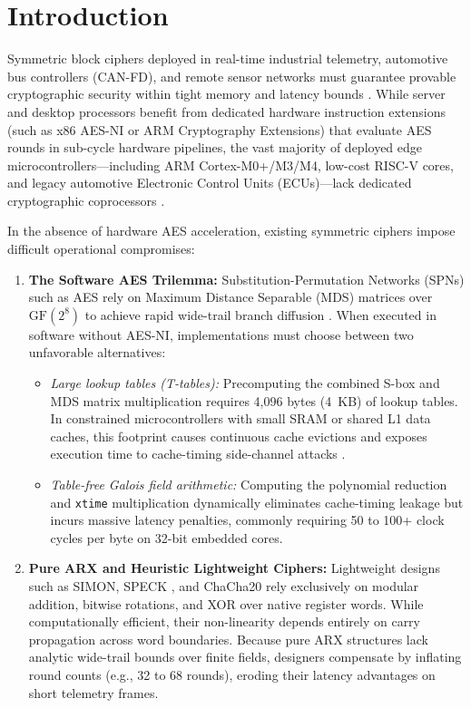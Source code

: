 \documentclass[review,12pt]{elsarticle}
\begin{document}
\section{Introduction}
\label{sec:intro}
Symmetric block ciphers deployed in real-time industrial telemetry, automotive bus controllers (CAN-FD), and remote sensor networks must guarantee provable cryptographic security within tight memory and latency bounds \cite{shannon1949communication, daemen2002design, beaulieu2015simon}. While server and desktop processors benefit from dedicated hardware instruction extensions (such as x86 AES-NI or ARM Cryptography Extensions) that evaluate AES rounds in sub-cycle hardware pipelines, the vast majority of deployed edge microcontrollers---including ARM Cortex-M0+/M3/M4, low-cost RISC-V cores, and legacy automotive Electronic Control Units (ECUs)---lack dedicated cryptographic coprocessors \cite{beierle2020alzette, kaartinen2009comparative}.

In the absence of hardware AES acceleration, existing symmetric ciphers impose difficult operational compromises:
\begin{enumerate}
    \item \textbf{The Software AES Trilemma:} Substitution-Permutation Networks (SPNs) such as AES \cite{nist2001fips} rely on Maximum Distance Separable (MDS) matrices over $\text{GF}(2^8)$ to achieve rapid wide-trail branch diffusion \cite{daemen2002design}. When executed in software without AES-NI, implementations must choose between two unfavorable alternatives:
    \begin{itemize}
        \item \emph{Large lookup tables (T-tables):} Precomputing the combined S-box and MDS matrix multiplication requires 4,096 bytes (4~KB) of lookup tables. In constrained microcontrollers with small SRAM or shared L1 data caches, this footprint causes continuous cache evictions and exposes execution time to cache-timing side-channel attacks \cite{bernstein2005cache, gueron2010intel}.
        \item \emph{Table-free Galois field arithmetic:} Computing the polynomial reduction and \texttt{xtime} multiplication dynamically eliminates cache-timing leakage but incurs massive latency penalties, commonly requiring 50 to 100+ clock cycles per byte on 32-bit embedded cores.
    \end{itemize}
    \item \textbf{Pure ARX and Heuristic Lightweight Ciphers:} Lightweight designs such as SIMON, SPECK \cite{beaulieu2015simon}, and ChaCha20 \cite{nir2018chacha20} rely exclusively on modular addition, bitwise rotations, and XOR over native register words. While computationally efficient, their non-linearity depends entirely on carry propagation across word boundaries. Because pure ARX structures lack analytic wide-trail bounds over finite fields, designers compensate by inflating round counts (e.g., 32 to 68 rounds), eroding their latency advantages on short telemetry frames.
\end{enumerate}
\end{document}
